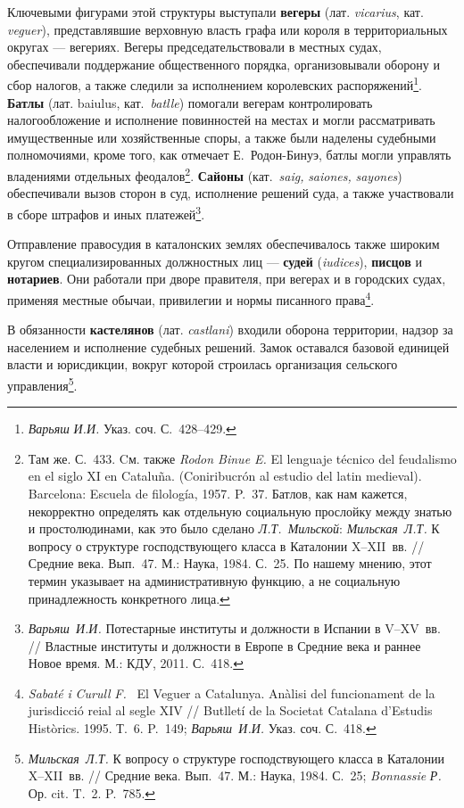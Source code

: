Ключевыми фигурами этой структуры выступали \textbf{вегеры} (лат. \emph{vicarius}, кат. \emph{veguer}), представлявшие верховную власть графа или короля в территориальных округах --- вегериях. Вегеры председательствовали в местных судах, обеспечивали поддержание общественного порядка, организовывали оборону и сбор налогов, а также следили за исполнением королевских распоряжений\footnote{\emph{Варьяш}\emph{ И.И.} Указ. соч. С.~428--429.}. \textbf{Батлы}\textbf{ }(лат. baiulus, кат.~\emph{batlle}) помогали вегерам контролировать налогообложение и исполнение повинностей на местах и могли рассматривать имущественные или хозяйственные споры, а также были наделены судебными полномочиями, кроме того, как отмечает Е.~Родон-Бинуэ, батлы могли управлять владениями отдельных феодалов\footnote{Там же. С.~433. Cм. также \emph{Rodon Binue E.} El lenguaje técnico del feudalismo en el siglo XI en Cataluña. (Coniribucrón al estudio del latin medieval). Barcelona: Escuela de filología, 1957. P.~37. Батлов, как нам кажется, некорректно определять как отдельную социальную прослойку между знатью и простолюдинами, как это было сделано \emph{Л.Т.~Мильской}: \emph{Мильская}\emph{~Л.Т.} К вопросу о структуре господствующего класса в Каталонии X--XII~вв. // Средние века. Вып.~47. М.: Наука, 1984. С.~25. По нашему мнению, этот термин указывает на административную функцию, а не социальную принадлежность конкретного лица.}. \textbf{С}\textbf{айоны}\textbf{ }(кат.~\emph{saig}\emph{,} \emph{saiones}\emph{, }\emph{sayones}) обеспечивали вызов сторон в суд, исполнение решений суда, а также участвовали в сборе штрафов и иных платежей\footnote{\emph{Варьяш}\emph{~И.И.} Потестарные институты и должности в Испании в V--XV~вв. // Властные институты и должности в Европе в Средние века и раннее Новое время. М.: КДУ, 2011. С.~418.}.

Отправление правосудия в каталонских землях обеспечивалось также широким кругом специализированных должностных лиц --- \textbf{судей} (\emph{iudices}), \textbf{писцов} и \textbf{нотариев}. Они работали при дворе правителя, при вегерах и в городских судах, применяя местные обычаи, привилегии и нормы писанного права\footnote{\emph{Sabat}\emph{é }\emph{i}\emph{ }\emph{Curull}\emph{ }\emph{F}\emph{.} ~El Veguer a Catalunya. Anàlisi del funcionament de la jurisdicció reial al segle XIV // Butlletí de la Societat Catalana d’Estudis Històrics. 1995. Т.~6. P.~149;\emph{ }\emph{Варьяш}\emph{~}\emph{И.И.} Указ. соч. С.~418.}.

В обязанности \textbf{кастелянов} (лат. \emph{castlani}) входили оборона территории, надзор за населением и исполнение судебных решений. Замок оставался базовой единицей власти и юрисдикции, вокруг которой строилась организация сельского управления\footnote{\emph{Мильская}\emph{~Л.Т.} К вопросу о структуре господствующего класса в Каталонии X--XII~вв. // Средние века. Вып.~47. М.: Наука, 1984. С.~25; \emph{Bonnassie}\emph{ Р. }Ор. cit. T.~2. P.~785.}.

